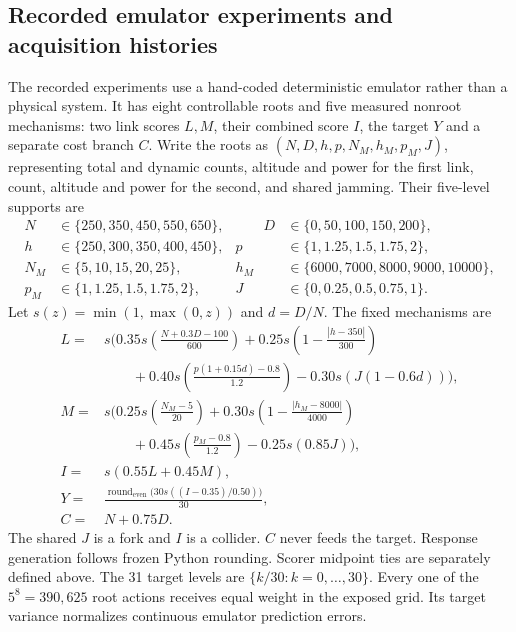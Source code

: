 \subsection{Recorded emulator experiments and acquisition histories}
The recorded experiments use a hand-coded deterministic emulator rather than
a physical system. It has eight controllable roots and five measured nonroot mechanisms:
two link scores $L,M$, their combined score $I$, the target $Y$ and a separate
cost branch $C$. Write the roots as $(N,D,h,p,N_M,h_M,p_M,J)$, representing
total and dynamic counts, altitude and power for the first link, count, altitude
and power for the second, and shared jamming. Their five-level supports are
\[
\begin{alignedat}{2}
 N&\in\{250,350,450,550,650\},&\qquad D&\in\{0,50,100,150,200\},\\
 h&\in\{250,300,350,400,450\},& p&\in\{1,1.25,1.5,1.75,2\},\\
 N_M&\in\{5,10,15,20,25\},& h_M&\in\{6000,7000,8000,9000,10000\},\\
 p_M&\in\{1,1.25,1.5,1.75,2\},& J&\in\{0,0.25,0.5,0.75,1\}.
\end{alignedat}
\]
Let $s(z)=\min(1,\max(0,z))$ and $d=D/N$. The fixed mechanisms are
\[
\begin{aligned}
 L={}&s\Biggl(0.35s\left(\frac{N+0.3D-100}{600}\right)
 +0.25s\left(1-\frac{|h-350|}{300}\right)\\
 &\qquad+0.40s\left(\frac{p(1+0.15d)-0.8}{1.2}\right)
 -0.30s(J(1-0.6d))\Biggr),\\[4pt]
 M={}&s\Biggl(0.25s\left(\frac{N_M-5}{20}\right)
 +0.30s\left(1-\frac{|h_M-8000|}{4000}\right)\\
 &\qquad+0.45s\left(\frac{p_M-0.8}{1.2}\right)
 -0.25s(0.85J)\Biggr),\\[4pt]
 I={}&s(0.55L+0.45M),\\[4pt]
 Y={}&\frac{\operatorname{round}_{\mathrm{even}}\!\bigl(30s((I-0.35)/0.50)\bigr)}{30},\\[4pt]
 C={}&N+0.75D.
\end{aligned}
\]
The shared $J$ is a fork and $I$ is a collider. $C$ never feeds the target.
Response generation follows frozen Python rounding. Scorer midpoint ties are
separately defined above. The 31 target levels are $\{k/30:k=0,\ldots,30\}$.
Every one of the $5^8=390{,}625$ root actions receives equal weight in the exposed
grid. Its target variance normalizes continuous emulator prediction errors.

